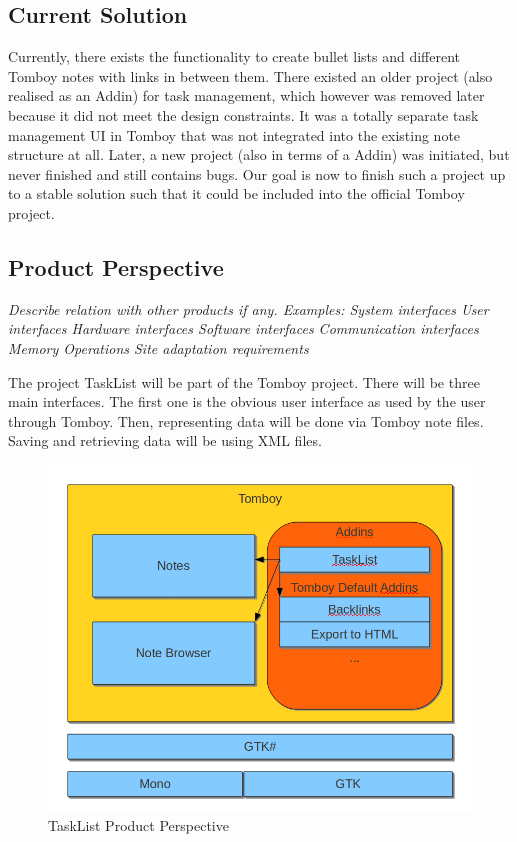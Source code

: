 \subsection{Current Solution}
\label{description:solution}

Currently, there exists the functionality to create bullet lists and different Tomboy notes with links in between them.
There existed an older project (also realised as an Addin) for task management, which however was removed later because it did not meet the design constraints. It was a totally separate task management UI in Tomboy that was not integrated
into the existing note structure at all. Later, a new project (also in terms of a Addin) was initiated, but never finished and still contains bugs.
Our goal is now to finish such a project up to a stable solution such that it could be included into the official Tomboy project.

\subsection{Product Perspective}
\label{description:perspective}
\textit{
Describe relation with other products if any. Examples:
System interfaces
User interfaces
Hardware interfaces
Software interfaces
Communication interfaces
Memory
Operations
Site adaptation requirements}

The project TaskList will be part of the Tomboy project. There will be three main interfaces. The first one is the obvious user interface as used by the user through Tomboy. Then, representing data will be done via Tomboy note files. Saving and retrieving data will be using XML files. 

\begin{figure}[h]
 \includegraphics[width=\textwidth]{graphics/product_perspective_diagram.png}
 \caption{TaskList Product Perspective}
 \label{gui}
\end{figure}


